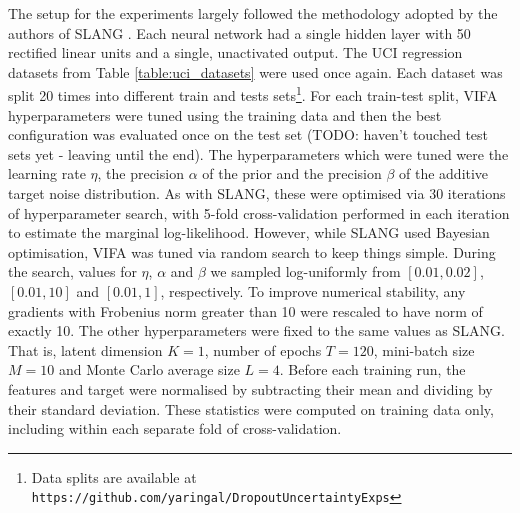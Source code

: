 \documentclass[msc,deptreport.inf]{infthesis} %
\begin{document}
The setup for the experiments largely followed the methodology adopted by the authors of SLANG \cite{mishkin2018}. Each neural network had a single hidden layer with 50 rectified linear units and a single, unactivated output. The UCI regression datasets from Table \ref{table:uci_datasets} were used once again. Each dataset was split 20 times into different train and tests sets\footnote{Data splits are available at \texttt{https://github.com/yaringal/DropoutUncertaintyExps}}. For each train-test split, VIFA hyperparameters were tuned using the training data and then the best configuration was evaluated once on the test set (TODO: haven't touched test sets yet - leaving until the end). The hyperparameters which were tuned were the learning rate $\eta$, the precision $\alpha$ of the prior and the precision $\beta$ of the additive target noise distribution. As with SLANG, these were optimised via 30 iterations of hyperparameter search, with 5-fold cross-validation performed in each iteration to estimate the marginal log-likelihood. However, while SLANG used Bayesian optimisation, VIFA was tuned via random search to keep things simple. During the search, values for $\eta$, $\alpha$ and $\beta$ we sampled log-uniformly from $[0.01, 0.02]$, $[0.01, 10]$ and $[0.01, 1]$, respectively. To improve numerical stability, any gradients with Frobenius norm greater than 10 were rescaled to have norm of exactly 10. The other hyperparameters were fixed to the same values as SLANG. That is, latent dimension $K=1$, number of epochs $T=120$, mini-batch size $M=10$ and Monte Carlo average size $L=4$.  Before each training run, the features and target were normalised by subtracting their mean and dividing by their standard deviation. These statistics were computed on training data only, including within each separate fold of cross-validation.  
\end{document}
